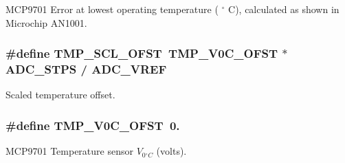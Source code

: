 M\-C\-P9701 Error at lowest operating temperature ( $ ^\circ$ C), calculated as shown in Microchip A\-N1001. \hypertarget{a00058_a0f910bb108922c8686a139977510af53}{
\subsubsection[{T\-M\-P\-\_\-\-S\-C\-L\-\_\-\-O\-F\-S\-T}]{\setlength{\rightskip}{0pt plus 5cm}\#define T\-M\-P\-\_\-\-S\-C\-L\-\_\-\-O\-F\-S\-T~{\bf T\-M\-P\-\_\-\-V0\-C\-\_\-\-O\-F\-S\-T} $\ast$ {\bf A\-D\-C\-\_\-\-S\-T\-P\-S} / {\bf A\-D\-C\-\_\-\-V\-R\-E\-F}}}\label{a00058_a0f910bb108922c8686a139977510af53}
Scaled temperature offset. \hypertarget{a00058_a6d41a70e126c748f2c99c3ff8228eb1b}{
\subsubsection[{T\-M\-P\-\_\-\-V0\-C\-\_\-\-O\-F\-S\-T}]{\setlength{\rightskip}{0pt plus 5cm}\#define T\-M\-P\-\_\-\-V0\-C\-\_\-\-O\-F\-S\-T~0.}}\label{a00058_a6d41a70e126c748f2c99c3ff8228eb1b}
M\-C\-P9701 Temperature sensor $ V_{0{^\circ}C}$ (volts). 

